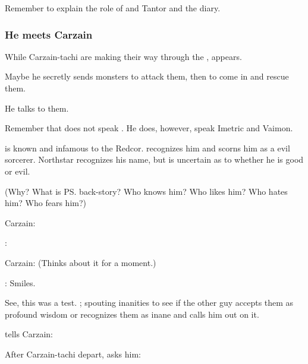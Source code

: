 Remember to explain the role of \Ambrose \Onatol and \Jirad Tantor and the diary. 





\subsubsection{He meets Carzain}
While Carzain-tachi are making their way through the \Wylde{}, \Ishnaruchaefir{} appears. 

Maybe he secretly sends monsters to attack them, then to come in and rescue them. 

He talks to them.

Remember that \Ishnaruchaefir{} does not speak \Velcadian. 
He does, however, speak Imetric and Vaimon. 

\Ishnaruchaefir{} is known and infamous to the Redcor. 
\Esmerel{} recognizes him and scorns him as a evil sorcerer. 
Northstar recognizes his name, but is uncertain as to whether he is good or evil. 

(Why? 
What is \ps{\Ishnaruchaefir} back-story? 
Who knows him? 
Who likes him? 
Who hates him? 
Who fears him?)

Carzain: 

\Ishnaruchaefir{}: 

Carzain: (Thinks about it for a moment.) 

\Ishnaruchaefir:  Smiles. 

See, this was a test. 
\Ishnaruchaefir{} ; spouting inanities to see if the other guy accepts them as profound wisdom or recognizes them as inane and calls him out on it. 

\Ishnaruchaefir{} tells Carzain: 

After Carzain-tachi depart, \Criseis{} asks him: 


